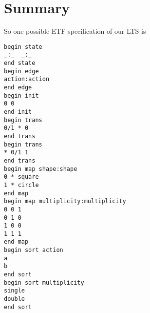 \section{Summary}

So one possible ETF specification of our LTS is

\begin{verbatim}
begin state
_:_  _:_
end state
begin edge
action:action
end edge
begin init
0 0
end init
begin trans
0/1 * 0
end trans
begin trans
* 0/1 1
end trans
begin map shape:shape
0 * square
1 * circle
end map
begin map multiplicity:multiplicity
0 0 1
0 1 0
1 0 0
1 1 1
end map
begin sort action
a
b
end sort
begin sort multiplicity
single
double
end sort
\end{verbatim}


